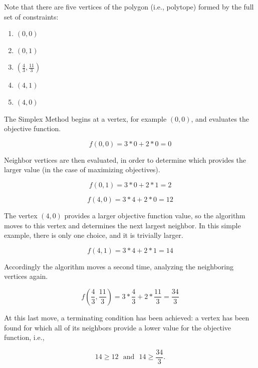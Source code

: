 Note that there are five vertices of the polygon (i.e., polytope) formed by the
full set of constraints:

\begin{enumerate}
  \item $(0, 0)$
  \item $(0, 1)$
  \item $(\frac{4}{3}, \frac{11}{3})$
  \item $(4, 1)$
  \item $(4, 0)$
\end{enumerate}

The Simplex Method begins at a vertex, for example $(0, 0)$, and evaluates the
objective function.

\begin{equation}
    f(0, 0) = 3 * 0 + 2 * 0 = 0 
\end{equation}

Neighbor vertices are then evaluated, in order to determine which provides the
larger value (in the case of maximizing objectives).

\begin{equation}
    f(0, 1) = 3 * 0 + 2 * 1 = 2 
\end{equation}

\begin{equation}
    f(4, 0) = 3 * 4 + 2 * 0 = 12 
\end{equation}

The vertex $(4, 0)$ provides a larger objective function value, so the algorithm
moves to this vertex and determines the next largest neighbor. In this simple
example, there is only one choice, and it is trivially larger.

\begin{equation}
    f(4, 1) = 3 * 4 + 2 * 1 = 14 
\end{equation}

Accordingly the algorithm moves a second time, analyzing the neighboring
vertices again.

\begin{equation}
    f(\frac{4}{3}, \frac{11}{3}) = 3 * \frac{4}{3} + 2 * \frac{11}{3} = \frac{34}{3} 
\end{equation}

At this last move, a terminating condition has been achieved: a vertex has been
found for which all of its neighbors provide a lower value for the objective
function, i.e.,

\begin{equation}
    14 \geq 12 \:\:\: \text{and} \:\:\: 14 \geq \frac{34}{3}.
\end{equation}


